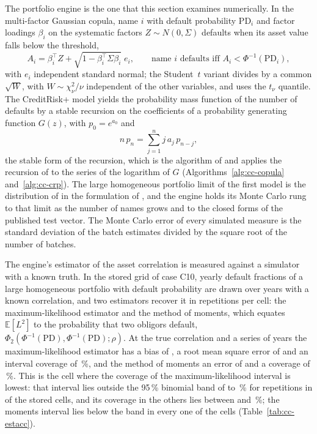 The portfolio engine is the one that this section examines numerically. In the multi-factor Gaussian copula, name $i$ with default probability $\mathrm{PD}_i$ and
factor loadings $\beta_i$ on the systematic factors $Z\sim N(0,\Sigma)$ defaults when its asset value falls below the threshold,
\begin{equation}
A_i=\beta_i^{\top}Z+\sqrt{1-\beta_i^{\top}\Sigma\beta_i}\;e_i,\qquad \text{name } i\text{ defaults iff } A_i<\Phi^{-1}(\mathrm{PD}_i),
\label{eq:bs6-copula}
\end{equation}
with $e_i$ independent standard normal; the Student~$t$ variant divides by a common $\sqrt{W}$, with $W\sim\chi^{2}_{\nu}/\nu$ independent of the other variables, and uses the $t_\nu$ quantile. The CreditRisk+ model
yields the probability mass function of the number of defaults by a stable recursion on the coefficients of a probability generating function
$G(z)$, with $p_0=e^{a_0}$ and
\begin{equation}
n\,p_n=\sum_{j=1}^{n} j\,a_j\,p_{n-j},
\label{eq:bs6-recursion}
\end{equation}
the stable form of the recursion, which is the algorithm of \citet{credit-capital:haaf2004} and applies the recursion of \citet{oprisk:panjer1981} to the series of the logarithm of $G$ (Algorithms~\ref{alg:cc-copula} and~\ref{alg:cc-crp}). The large homogeneous portfolio limit of the first model is the
distribution of \citet{ratings:vasicek2002} in the formulation of \citet{ratings:gordy2003}, and the engine holds its Monte Carlo rung to that limit as the number
of names grows and to the closed forms of the published test vector. The Monte Carlo error of every simulated measure is the standard deviation of the batch
estimates divided by the square root of the number of batches.

The engine's estimator of the asset correlation is measured against a simulator with a known truth. In the stored grid of case C10, yearly default fractions of a large
homogeneous portfolio with default probability \pxSixPd{} are drawn over \pxSixYears{} years with a known correlation, and two estimators recover it in \pxSixReps{}
repetitions per cell: the maximum-likelihood estimator and the method of moments, which equates $\mathbb E[L^{2}]$ to the probability that two obligors default,
$\Phi_2(\Phi^{-1}(\mathrm{PD}),\Phi^{-1}(\mathrm{PD});\rho)$. At the true correlation \pxSixRhoKnown{} and a series of \pxSixYears{} years the maximum-likelihood estimator has a bias of \pxSixMlBias{}, a root mean
square error of \pxSixMlRmse{} and an interval coverage of \pxSixMlCov{}\,\%, and the method of moments an error of \pxSixMomRmse{} and a coverage of \pxSixMomCov{}\,\%. This is the cell where
the coverage of the maximum-likelihood interval is lowest: that interval lies outside the 95\,\% binomial band of \pxSixBandLow{} to \pxSixBandHigh{}\,\% for \pxSixReps{} repetitions in \pxSixCovOutside{} of the \pxSixCells{} stored cells, and its coverage in
the others lies between \pxSixCovInMin{} and \pxSixCovInMax{}\,\%; the moments interval lies below the band in every one of the \pxSixCells{} cells (Table~\ref{tab:cc-estacc}).

